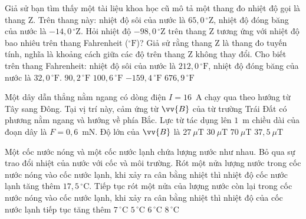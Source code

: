 	\begin{ex}%
		Giả sử bạn tìm thấy một tài liệu khoa học cũ mô tả một thang đo nhiệt độ gọi là thang Z. Trên thang này: nhiệt độ sôi của nước là $65{,}0\,^\circ\text{Z}$, nhiệt độ đóng băng của nước là $-14{,}0\,^\circ\text{Z}$. Hỏi nhiệt độ $-98{,}0\,^\circ\text{Z}$ trên thang Z tương ứng với nhiệt độ bao nhiêu trên thang Fahrenheit ($^\circ\text{F}$)? Giả sử rằng thang Z là thang đo tuyến tính, nghĩa là khoảng cách giữa các độ trên thang Z không thay đổi. Cho biết trên thang Fahrenheit: nhiệt độ sôi của nước là $212{,}0\,^\circ\text{F}$, nhiệt độ đóng băng của nước là $32{,}0\,^\circ\text{F}$.
		\choice
		{$90{,}2\,^\circ\text{F}$}
		{$100{,}6\,^\circ\text{F}$}
		{\True $-159{,}4\,^\circ\text{F}$}
		{$676{,}9\,^\circ\text{F}$}
	\end{ex}

	\begin{ex}%
		Một dây dẫn thẳng nằm ngang có dòng điện $I=16$~A chạy qua theo hướng từ Tây sang Đông. Tại vị trí này, cảm ứng từ $\vv{B}$ của từ trường Trái Đất có phương nằm ngang và hướng về phía Bắc. Lực từ tác dụng lên $1$~m chiều dài của đoạn dây là $F=0{,}6$~mN. Độ lớn của $\vv{B}$ là
		\choice
		{$27~\mu\text{T}$}
		{$30~\mu\text{T}$}
		{$70~\mu\text{T}$}
		{\True $37{,}5~\mu\text{T}$}
	\end{ex}

	\begin{ex}%
		Một cốc nước nóng và một cốc nước lạnh chứa lượng nước như nhau. Bỏ qua sự trao đổi nhiệt của nước với cốc và môi trường. Rót một nửa lượng nước trong cốc nước nóng vào cốc nước lạnh, khi xảy ra cân bằng nhiệt thì nhiệt độ cốc nước lạnh tăng thêm $17{,}5\,^\circ\text{C}$. Tiếp tục rót một nửa của lượng nước còn lại trong cốc nước nóng vào cốc nước lạnh, khi xảy ra cân bằng nhiệt thì nhiệt độ của cốc nước lạnh tiếp tục tăng thêm
		\choice
		{$7\,^\circ\text{C}$}
		{\True $5\,^\circ\text{C}$}
		{$6\,^\circ\text{C}$}
		{$8\,^\circ\text{C}$}
	\end{ex}

